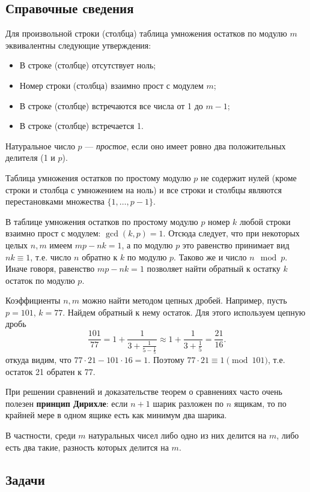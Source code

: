 \subsection*{Справочные сведения}

Для произвольной строки (столбца) таблица умножения остатков по модулю $m$ эквивалентны следующие утверждения:
\begin{itemize}
\item В строке (столбце) отсутствует ноль;
\item Номер строки (столбца) взаимно прост с модулем $m$;
\item В строке (столбце) встречаются все числа от 1 до $m-1$;
\item В строке (столбце) встречается 1.
\end{itemize}

Натуральное число $p$ --- \textit{простое}, если оно имеет ровно два положительных делителя (1 и $p$).

Таблица умножения остатков по простому модулю $p$ не содержит нулей (кроме строки и столбца с умножением на ноль) и все строки и столбцы являются перестановками множества $\{1,\dots,p-1\}$.

В таблице умножения остатков по простому модулю $p$ номер $k$ любой строки взаимно прост с модулем: $\gcd(k,p)=1$. Отсюда следует, что при некоторых целых $n,m$ имеем $mp-nk=1$, а по модулю $p$ это равенство принимает вид $nk\equiv 1$, т.е. число $n$ обратно к $k$ по модулю $p$. Таково же и число $n\mod p$. Иначе говоря, равенство $mp-nk=1$ позволяет найти обратный к остатку $k$ остаток по модулю $p$.

Коэффициенты $n,m$ можно найти методом цепных дробей. Например, пусть $p=101$, $k=77$. Найдем обратный к нему остаток. Для этого используем цепную дробь
$$
\frac{101}{77} = 1+\frac{1}{3+\frac{1}{5-\frac{1}{5}}}\approx
1+\frac{1}{3+\frac{1}{5}}=\frac{21}{16}.
$$
откуда видим, что $77\cdot 21-101\cdot 16=1$. Поэтому $77\cdot 21\equiv 1\pmod{101}$, т.е. остаток 21 обратен к 77.

При решении сравнений и доказательстве теорем о сравнениях часто очень полезен \textbf{принцип Дирихле}: если $n+1$ шарик разложен по $n$ ящикам, то по крайней мере в одном ящике есть как минимум два шарика.

В частности, среди $m$ натуральных чисел либо одно из них делится на $m$, либо есть два такие, разность которых делится на $m$.


\subsection*{Задачи}


